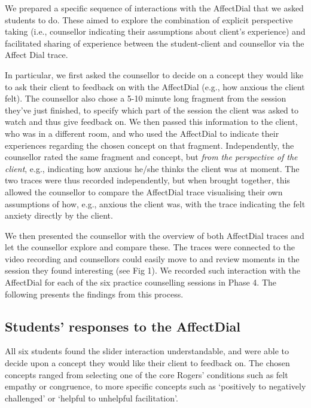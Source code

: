 \documentclass{sigchi}
\begin{document}
We prepared a specific sequence of interactions with the AffectDial that we asked students to do. These aimed to explore the combination of explicit perspective taking (i.e., counsellor indicating their assumptions about client's experience) and facilitated sharing of experience between the student-client and counsellor via the Affect Dial trace.  

In particular, we first asked the counsellor to decide on a concept they would like to ask their client to feedback on with the AffectDial (e.g., how anxious the client felt). The counsellor also chose a 5-10 minute long fragment from the session they've just finished, to specify which part of the session the client was asked to watch and thus give feedback on. We then passed this information to the client, who was in a different room, and who used the AffectDial to indicate their experiences regarding the chosen concept on that fragment. Independently, the counsellor rated the same fragment and concept, but \emph{from the perspective of the client}, e.g., indicating how anxious he/she thinks the client was at moment. The two traces were thus recorded independently, but when brought together, this allowed the counsellor to compare the AffectDial trace visualising their own assumptions of how, e.g.,  anxious the client was, with the trace indicating the felt anxiety directly by the client.  

We then presented the counsellor with the overview of both AffectDial traces and let the counsellor explore and compare these. The traces were connected to the video recording and counsellors could easily move to and review moments in the session they found interesting (see Fig 1). We recorded such interaction with the AffectDial for each of the six practice counselling sessions in Phase 4. The following presents the findings from this process.


\subsection{Students' responses to the AffectDial}
All six students found the slider interaction understandable, and were able to decide upon a concept they would like their client to feedback on. The chosen concepts ranged from selecting one of the core Rogers' conditions such as felt empathy or congruence, to more specific concepts such as `positively to negatively challenged' or `helpful to unhelpful facilitation'. 
\end{document}
